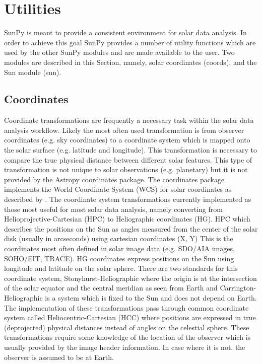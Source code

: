 \section{Utilities}
SunPy is meant to provide a consistent environment for solar data analysis. In order to
achieve this goal SunPy provides a number of utility functions which are used by the other
SunPy modules and are made available to the user. Two modules are described in this Section, 
namely, solar coordinates (coords), and the Sun module (sun). 
	
\subsection{Coordinates}
Coordinate transformations are frequently a necessary task within the solar data analysis
workflow. Likely the most often used transformation is from observer coordinates (e.g. 
sky coordinates) to a coordinate system which is mapped onto the solar surface (e.g.
latitude and longitude). This transformation is necessary to compare the true physical
distance between different solar features. This type of transformation is not unique
to solar observations (e.g. planetary) but it is not provided by the Astropy coordinates 
package. The coordinates package implements the World Coordinate System (WCS) for solar
coordinates as described by \cite{Thompson2000}. The coordinate system transformations
currently implemented as those most useful for most solar data analysis, namely 
converting from Helioprojective-Cartesian (HPC) to Heliographic coordinates (HG). HPC 
which describes the positions on the Sun as angles measured from the center of the solar 
disk (usually in arcseconds) using cartesian coordinates (X, Y) This is the coordinates 
most often defined in solar image data (e.g. SDO/AIA images, SOHO/EIT, TRACE). HG
coordinates express positions on the Sun using longitude and latitude on the solar 
sphere. There are two standards for this coordinate system, Stonyhurst-Heliographic 
where the origin is at the intersection of the solar equator and 
the central meridian as seen from Earth and Carrington-Heliographic is a system which is
fixed to the Sun and does not depend on Earth. The implementation of these transformations
pass through common coordinate system called Heliocentric-Cartesian (HCC) where positions 
are expressed in true (deprojected) physical distances instead of angles on the celestial sphere.
These transformations require some knowledge of the location of the observer which is
usually provided by the image header information. In case where it is not, the observer
is assumed to be at Earth.


